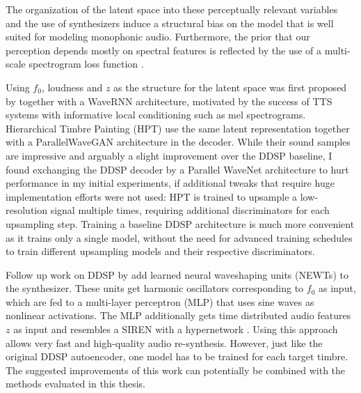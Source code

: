 The organization of the latent space into these perceptually relevant variables and the use of synthesizers induce a structural bias on the model that is well suited for modeling monophonic audio.
Furthermore, the prior that our perception depends mostly on spectral features is reflected by the use of a multi-scale spectrogram loss function \citep{wang_neural_2019}.


Using $f_0$, loudness and $z$ as the structure for the latent space was first proposed by \citet{hantrakul_fast_2019-1} together with a WaveRNN architecture, motivated by the success of TTS systems with informative local conditioning such as mel spectrograms.
Hierarchical Timbre Painting (HPT) \citep{michelashvili_hierarchical_2020} use the same latent representation together with a ParallelWaveGAN \citep{yamamoto_parallel_2020} architecture in the decoder.
While their sound samples are impressive and arguably a slight improvement over the DDSP baseline, I found exchanging the DDSP decoder by a Parallel WaveNet architecture to hurt performance in my initial experiments, if additional tweaks that require huge implementation efforts were not used: HPT is trained to upsample a low-resolution signal multiple times, requiring additional discriminators for each upsampling step. Training a baseline DDSP architecture is much more convenient as it trains only a single model, without the need for advanced training schedules to train different upsampling models and their respective discriminators.



Follow up work on DDSP by \citet{hayes_neural_nodate} add learned neural waveshaping units (NEWTs) to the synthesizer. These units get harmonic oscillators corresponding to $f_0$ as input, which are fed to a multi-layer perceptron (MLP) that uses sine waves as nonlinear activations.
The MLP additionally gets time distributed audio features $z$ as input and resembles a SIREN with a hypernetwork \citep{siren}.
Using this approach allows very fast and high-quality audio re-synthesis. However, just like the original DDSP autoencoder, one model has to be trained for each target timbre. The suggested improvements of this work can potentially be combined with the methods evaluated in this thesis. \newline

